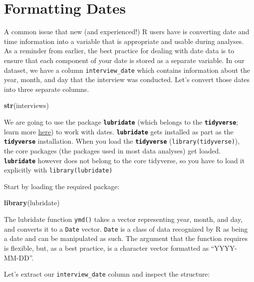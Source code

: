 \documentclass[]{book}
\newenvironment{Shaded}{\begin{snugshade}}{\end{snugshade}}
\newcommand{\KeywordTok}[1]{\textcolor[rgb]{0.13,0.29,0.53}{\textbf{#1}}}
\newcommand{\NormalTok}[1]{#1}
\begin{document}
\section{Formatting Dates}\label{formatting-dates}

A common issue that new (and experienced!) R users have is converting
date and time information into a variable that is appropriate and usable
during analyses. As a reminder from earlier, the best practice for
dealing with date data is to ensure that each component of your date is
stored as a separate variable. In our dataset, we have a column
\texttt{interview\_date} which contains information about the year,
month, and day that the interview was conducted. Let's convert those
dates into three separate columns.

\begin{Shaded}
\begin{Highlighting}[]
\KeywordTok{str}\NormalTok{(interviews)}
\end{Highlighting}
\end{Shaded}

We are going to use the package \textbf{\texttt{lubridate}} (which
belongs to the \textbf{\texttt{tidyverse}}; learn more
\href{https://www.tidyverse.org/}{here}) to work with dates.
\textbf{\texttt{lubridate}} gets installed as part as the
\textbf{\texttt{tidyverse}} installation. When you load the
\textbf{\texttt{tidyverse}} (\texttt{library(tidyverse)}), the core
packages (the packages used in most data analyses) get loaded.
\textbf{\texttt{lubridate}} however does not belong to the core
tidyverse, so you have to load it explicitly with
\texttt{library(lubridate)}

Start by loading the required package:

\begin{Shaded}
\begin{Highlighting}[]
\KeywordTok{library}\NormalTok{(lubridate)}
\end{Highlighting}
\end{Shaded}

The lubridate function \texttt{ymd()} takes a vector representing year,
month, and day, and converts it to a \texttt{Date} vector. \texttt{Date}
is a class of data recognized by R as being a date and can be
manipulated as such. The argument that the function requires is
flexible, but, as a best practice, is a character vector formatted as
``YYYY-MM-DD''.

Let's extract our \texttt{interview\_date} column and inspect the
structure:
\end{document}
